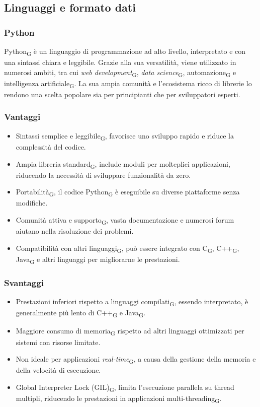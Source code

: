 \subsection{Linguaggi e formato dati}

\subsubsection{Python}
Python\textsubscript{G} è un linguaggio di programmazione ad alto livello, interpretato e con una sintassi chiara e leggibile. Grazie alla sua versatilità, viene utilizzato in numerosi ambiti, tra cui \textit{web development}\textsubscript{G}, \textit{data science}\textsubscript{G}, automazione\textsubscript{G} e intelligenza artificiale\textsubscript{G}. La sua ampia comunità e l’ecosistema ricco di librerie lo rendono una scelta popolare sia per principianti che per sviluppatori esperti.  

\subsubsection{Vantaggi}  
\begin{itemize}  
    \item Sintassi semplice e leggibile\textsubscript{G}, favorisce uno sviluppo rapido e riduce la complessità del codice.  
    \item Ampia libreria standard\textsubscript{G}, include moduli per molteplici applicazioni, riducendo la necessità di sviluppare funzionalità da zero.  
    \item Portabilità\textsubscript{G}, il codice Python\textsubscript{G} è eseguibile su diverse piattaforme senza modifiche.  
    \item Comunità attiva e supporto\textsubscript{G}, vasta documentazione e numerosi forum aiutano nella risoluzione dei problemi.  
    \item Compatibilità con altri linguaggi\textsubscript{G}, può essere integrato con C\textsubscript{G}, C++\textsubscript{G}, Java\textsubscript{G} e altri linguaggi per migliorarne le prestazioni.  
\end{itemize}  

\subsubsection{Svantaggi}  
\begin{itemize}  
    \item Prestazioni inferiori rispetto a linguaggi compilati\textsubscript{G}, essendo interpretato, è generalmente più lento di C++\textsubscript{G} e Java\textsubscript{G}.  
    \item Maggiore consumo di memoria\textsubscript{G} rispetto ad altri linguaggi ottimizzati per sistemi con risorse limitate.  
    \item Non ideale per applicazioni \textit{real-time}\textsubscript{G}, a causa della gestione della memoria e della velocità di esecuzione.  
    \item Global Interpreter Lock (GIL)\textsubscript{G}, limita l’esecuzione parallela su thread multipli, riducendo le prestazioni in applicazioni multi-threading\textsubscript{G}.  
\end{itemize}  

